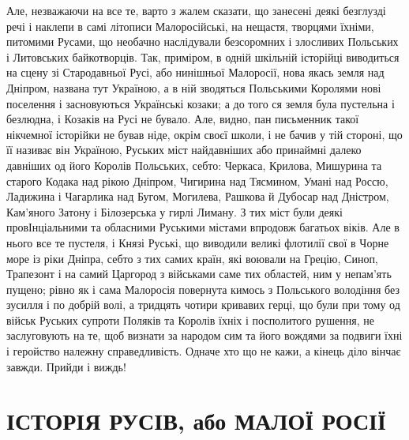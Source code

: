 Але, незважаючи на все те, варто з жалем сказати, що занесені деякі безглузді
речі і наклепи в самі літописи Малоросійські, на нещастя, творцями їхніми,
питомими Русами, що необачно наслідували безсоромних і злосливих Польських і
Литовських байкотворців. Так, приміром, в одній шкільній історійці виводиться
на сцену зі Стародавньої Русі, або нинішньої Малоросії, нова якась земля над
Дніпром, названа тут Україною, а в ній зводяться Польськими Королями нові
поселення і засновуються Українські козаки; а до того ся земля була пустельна і
безлюдна, і Козаків на Русі не бувало. Але, видно, пан письменник такої
нікчемної історійки не бував ніде, окрім своєї школи, і не бачив у тій стороні,
що її називає він Україною, Руських міст найдавніших або принаймні далеко
давніших од його Королів Польських, себто: Черкаса, Крилова, Мишурина та
старого Кодака над рікою Дніпром, Чигирина над Тясмином, Умані над Россю,
Ладижина і Чагарлика над Бугом, Могилева, Рашкова й Дубосар над Дністром,
Кам'яного Затону і Білозерська у гирлі Лиману. З тих міст були деякі
провІнціальними та обласними Руськими містами впродовж багатьох віків. Але в
нього все те пустеля, і Князі Руські, що виводили великі флотилії свої в Чорне
море із ріки Дніпра, себто з тих самих країн, які воювали на Грецію, Синоп,
Трапезонт і на самий Царгород з військами саме тих областей, ним у непам'ять
пущено; рівно як і сама Малоросія повернута кимось з Польського володіння без
зусилля і по добрій волі, а тридцять чотири кривавих герці, що були при тому од
військ Руських супроти Поляків та Королів їхніх і посполитого рушення, не
заслуговують на те, щоб визнати за народом сим та його вождями за подвиги їхні
і геройство належну справедливість. Одначе хто що не кажи, а кінець діло вінчає
завжди. Прийди і виждь!

\section{ІСТОРІЯ РУСІВ, або МАЛОЇ РОСІЇ}

